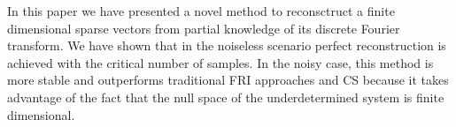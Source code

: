 \documentclass{article}
\begin{document}
In this paper we have presented a novel method to reconsctruct a finite dimensional
sparse vectors from partial knowledge of its discrete Fourier transform. We have shown
that in the noiseless scenario perfect reconstruction is achieved with the critical 
number of samples. In the noisy case, this method is more stable and outperforms 
traditional FRI approaches and CS because it takes advantage of the fact that the null space
of the underdetermined system is finite dimensional.


\vfill\pagebreak

%




\end{document}
